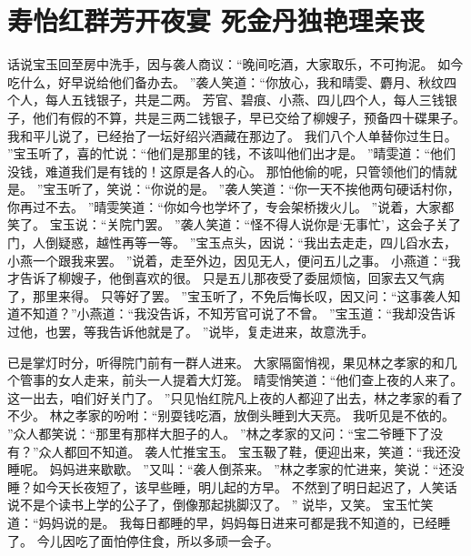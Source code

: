 \chapter{寿怡红群芳开夜宴 \quad 死金丹独艳理亲丧}
\par
话说宝玉回至房中洗手，因与袭人商议：“晚间吃酒，大家取乐，不可拘泥。
如今吃什么，好早说给他们备办去。
”袭人笑道：“你放心，我和晴雯、麝月、秋纹四个人，每人五钱银子，共是二两。
芳官、碧痕、小燕、四儿四个人，每人三钱银子，他们有假的不算，共是三两二钱银子，早已交给了柳嫂子，预备四十碟果子。
我和平儿说了，已经抬了一坛好绍兴酒藏在那边了。
我们八个人单替你过生日。
”宝玉听了，喜的忙说：“他们是那里的钱，不该叫他们出才是。
”晴雯道：“他们没钱，难道我们是有钱的！这原是各人的心。
那怕他偷的呢，只管领他们的情就是。
”宝玉听了，笑说：“你说的是。
”袭人笑道：“你一天不挨他两句硬话村你，你再过不去。
”晴雯笑道：“你如今也学坏了，专会架桥拨火儿。
”说着，大家都笑了。
宝玉说：“关院门罢。
”袭人笑道：“怪不得人说你是‘无事忙’，这会子关了门，人倒疑惑，越性再等一等。
”宝玉点头，因说：“我出去走走，四儿舀水去，小燕一个跟我来罢。
”说着，走至外边，因见无人，便问五儿之事。
小燕道：“我才告诉了柳嫂子，他倒喜欢的很。
只是五儿那夜受了委屈烦恼，回家去又气病了，那里来得。
只等好了罢。
”宝玉听了，不免后悔长叹，因又问：“这事袭人知道不知道？”小燕道：“我没告诉，不知芳官可说了不曾。
”宝玉道：“我却没告诉过他，也罢，等我告诉他就是了。
”说毕，复走进来，故意洗手。
\par
已是掌灯时分，听得院门前有一群人进来。
大家隔窗悄视，果见林之孝家的和几个管事的女人走来，前头一人提着大灯笼。
晴雯悄笑道：“他们查上夜的人来了。
这一出去，咱们好关门了。
”只见怡红院凡上夜的人都迎了出去，林之孝家的看了不少。
林之孝家的吩咐：“别耍钱吃酒，放倒头睡到大天亮。
我听见是不依的。
”众人都笑说：“那里有那样大胆子的人。
”林之孝家的又问：“宝二爷睡下了没有？”众人都回不知道。
袭人忙推宝玉。
宝玉靸了鞋，便迎出来，笑道：“我还没睡呢。
妈妈进来歇歇。
”又叫：“袭人倒茶来。
”林之孝家的忙进来，笑说：“还没睡？如今天长夜短了，该早些睡，明儿起的方早。
不然到了明日起迟了，人笑话说不是个读书上学的公子了，倒像那起挑脚汉了。
”
说毕，又笑。
宝玉忙笑道：“妈妈说的是。
我每日都睡的早，妈妈每日进来可都是我不知道的，已经睡了。
今儿因吃了面怕停住食，所以多顽一会子。
